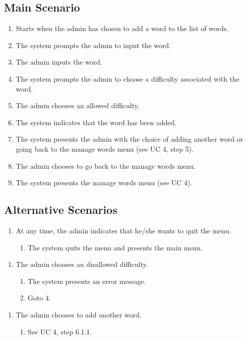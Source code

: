 \documentclass[12pt, letterpaper]{article}
\begin{document}
\subsection{Main Scenario}
\begin{enumerate}
	\item Starts when the admin has chosen to add a word to the list of words.
	\item The system prompts the admin to input the word.
	\item The admin inputs the word.
	\item The system prompts the admin to choose a difficulty associated with the word.
	\item The admin chooses an allowed difficulty.
	\item The system indicates that the word has been added.
	\item The system presents the admin with the choice of adding another word or going back to the manage words menu (see UC 4, step 5).
	\item The admin chooses to go back to the manage words menu.
	\item The system presents the manage words menu (see UC 4).
\end{enumerate}
\subsection{Alternative Scenarios}
\begin{enumerate}[label=a*.]
	\item At any time, the admin indicates that he/she wants to quit the menu.
	\begin{enumerate}[label=a*.1.]
		\item The system quits the menu and presents the main menu.
	\end{enumerate}
\end{enumerate}
\begin{enumerate}[label=5.1.]
	\item The admin chooses an disallowed difficulty. 
	\begin{enumerate}[label=5.1.\arabic*]
		\item The system presents an error message.
		\item Goto 4.
	\end{enumerate}
\end{enumerate}
\begin{enumerate}[label=7.1.]
	\item The admin chooses to add another word. 
	\begin{enumerate}[label=7.1.\arabic*]
		\item See UC 4, step 6.1.1.
	\end{enumerate}
\end{enumerate}
\end{document}
